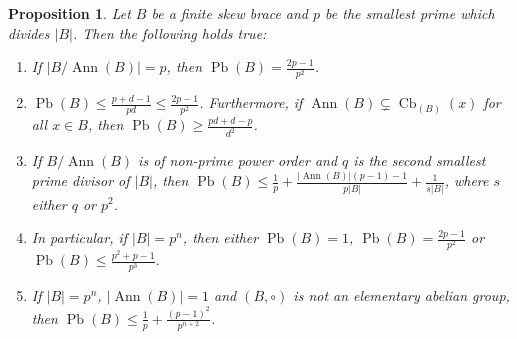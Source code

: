 \documentclass[oneside]{amsart}
\numberwithin{equation}{section}
\theoremstyle{plain}
\newtheorem{pro}[equation]{Proposition}
\theoremstyle{definition}
\newcommand{\Cb}{\operatorname{Cb} }
\newcommand{\Pb}{\operatorname{Pb} }
\newcommand{\Ann}{\operatorname{Ann} }
\begin{document}
\begin{pro}\label{thm:  prime fixed}
Let $B$ be a finite skew brace and  $p$ be the smallest prime which  divides $|B|$. Then  the following holds true:
\begin{enumerate}
\item  If $|B/\Ann(B)| = p$, then $\Pb(B)=\frac{2p-1}{p^2}$.
\item  $\Pb(B)\leqslant \frac{p+d-1}{pd} \leqslant \frac{2p-1}{p^2}$. Furthermore, if $\Ann(B) \subsetneq \Cb_{(B)}(x)$ for all $x \in B$, then $\Pb(B) \geqslant \frac{pd+d-p}{d^2}$.   
\item  If $B/\Ann(B)$ is of non-prime power order  and $q$ is the second smallest prime divisor of $|B|$, then $\Pb(B) \leqslant \frac{1}{p} + \frac{|\Ann(B)|(p - 1) - 1}{p |B|} + \frac{1}{s|B|}$, where $s$ either $q$ or $p^2$.
\item  In particular, if $|B| = p^n$, then  either $\Pb(B) =1$,  $\Pb(B) = \frac{2p-1}{p^2}$  or $\Pb(B) \leqslant  \frac{p^2+p-1}{p^3} $. 
\item If  $|B| = p^n$,  $|\Ann(B)| = 1$ and $(B, \circ)$ is not an elementary abelian group,  then $\Pb(B) \leqslant \frac{1}{p} + \frac{(p-1)^2}{p^{n+2}}$.
\end{enumerate}
\end{pro}
\end{document}
